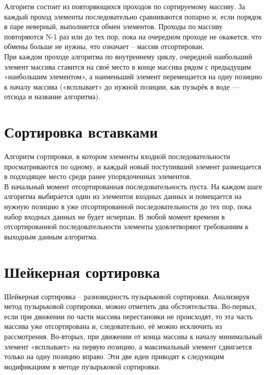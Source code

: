 \documentclass[12pt,a4paper]{report}
\begin{document}
Алгоритм состоит из повторяющихся проходов по сортируемому массиву. 
За каждый проход элементы последовательно сравниваются попарно и, если порядок в паре неверный, выполняется обмен элементов. 
Проходы по массиву повторяются N-1 раз или до тех пор, пока на очередном проходе не окажется, что обмены больше не нужны, что 
означает -- массив отсортирован. \\

При каждом проходе алгоритма по внутреннему циклу, очередной наибольший элемент массива ставится на своё место в конце массива 
рядом с предыдущим «наибольшим элементом», а наименьший элемент перемещается на одну позицию к началу массива («всплывает» до 
нужной позиции, как пузырёк в воде — отсюда и название алгоритма). \\

\section{Сортировка вставками}

Алгоритм сортировки, в котором элементы входной последовательности просматриваются по одному, и каждый новый поступивший 
элемент размещается в подходящее место среди ранее упорядоченных элементов.\\

В начальный момент отсортированная последовательность пуста. 
На каждом шаге алгоритма выбирается один из элементов входных данных и помещается на нужную позицию в уже отсортированной 
последовательности до тех пор, пока набор входных данных не будет исчерпан. 
В любой момент времени в отсортированной последовательности элементы удовлетворяют требованиям к выходным данным алгоритма. \\

\section{Шейкерная сортировка}

Шейкерная сортировка -- разновидность пузырьковой сортировки. 
Анализируя метод пузырьковой сортировки, можно отметить два обстоятельства.
Во-первых, если при движении по части массива перестановки не происходят, то эта часть массива уже отсортирована и, следовательно, 
её можно исключить из рассмотрения.
Во-вторых, при движении от конца массива к началу минимальный элемент «всплывает» на первую позицию, а максимальный элемент 
сдвигается только на одну позицию вправо.
Эти две идеи приводят к следующим модификациям в методе пузырьковой сортировки. \\
\end{document}

